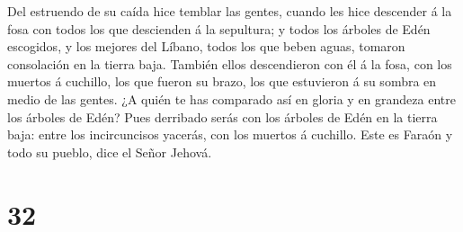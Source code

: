  Del estruendo de su caída hice temblar las gentes, cuando
les hice descender á la fosa con todos los que descienden á la
sepultura; y todos los árboles de Edén escogidos, y los mejores del
Líbano, todos los que beben aguas, tomaron consolación en la tierra
baja.  También ellos descendieron con él á la fosa, con los
muertos á cuchillo, los que fueron su brazo, los que estuvieron á su
sombra en medio de las gentes.  ¿A quién te has comparado
así en gloria y en grandeza entre los árboles de Edén? Pues derribado
serás con los árboles de Edén en la tierra baja: entre los incircuncisos
yacerás, con los muertos á cuchillo. Este es Faraón y todo su pueblo,
dice el Señor Jehová.

\hypertarget{section-31}{%
\section{32}\label{section-31}}

